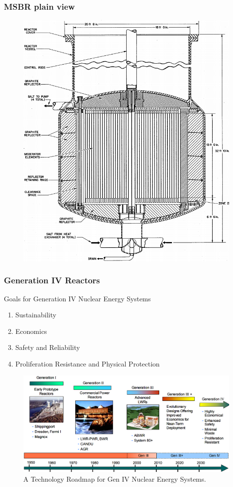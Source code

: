 \documentclass[9pt]{beamer}
\begin{document}
\begin{frame}
  \frametitle{\gls{MSBR} plain view}
               \begin{figure}[t]
                \vspace*{-0.1in}
                \includegraphics[height=0.75\textwidth]{./images/msbr_plain.png}
               \end{figure}
              
\end{frame}

\begin{frame}
  \frametitle{Generation IV Reactors}
              \begin{block}{Goals for Generation IV Nuclear Energy Systems}
               \begin{enumerate}
                \item Sustainability
                \item Economics
                \item Safety and Reliability
                \item Proliferation Resistance and Physical Protection
               \end{enumerate}
               \end{block}
               \begin{figure}[t]
                \vspace*{-0.11in}
		\hspace*{-0.15in}
                \includegraphics[height=0.43\textwidth]{./images/gen4_road_map.png}
                \vspace*{-0.1in}
                \caption{A Technology Roadmap for Gen IV Nuclear Energy Systems.}
               \end{figure}            
\end{frame}
\end{document}
